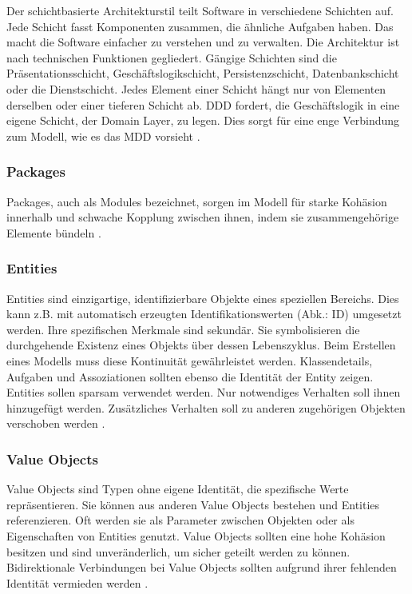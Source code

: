 {Der schichtbasierte Architekturstil teilt Software in verschiedene Schichten auf. Jede Schicht fasst Komponenten zusammen, die ähnliche Aufgaben haben. Das macht die Software einfacher zu verstehen und zu verwalten. Die Architektur ist nach technischen Funktionen gegliedert. Gängige Schichten sind die Präsentationsschicht, Geschäftslogikschicht, Persistenzschicht, Datenbankschicht oder die Dienstschicht. Jedes Element einer Schicht hängt nur von Elementen derselben oder einer tieferen Schicht ab. DDD fordert, die Geschäftslogik in eine eigene Schicht, der \glqq Domain Layer\grqq, zu legen. Dies sorgt für eine enge Verbindung zum Modell, wie es das MDD vorsieht \cite[S. 69 - 73]{evans} \cite[S.139-141]{richards}.


\subsubsection{Packages}

\glqq Packages\grqq, auch als \glqq Modules\grqq{} bezeichnet, sorgen im Modell für starke Kohäsion innerhalb und schwache Kopplung zwischen ihnen, indem sie zusammengehörige Elemente bündeln \cite[S. 109 - 116]{evans}.

\subsubsection{Entities}

\glqq Entities\grqq{} sind einzigartige, identifizierbare Objekte eines speziellen Bereichs. Dies kann z.B. mit automatisch erzeugten Identifikationswerten (Abk.: ID) umgesetzt werden. Ihre spezifischen Merkmale sind sekundär. Sie symbolisieren die durchgehende Existenz eines Objekts über dessen Lebenszyklus. Beim Erstellen eines Modells muss diese Kontinuität gewährleistet werden. Klassendetails, Aufgaben und Assoziationen sollten ebenso die Identität der Entity zeigen. Entities sollen sparsam verwendet werden. Nur notwendiges Verhalten soll ihnen hinzugefügt werden. Zusätzliches Verhalten soll zu anderen zugehörigen Objekten verschoben werden \cite[S. 89-96]{evans} \cite[S.75]{daschner}.

\subsubsection{Value Objects}

\glqq Value Objects\grqq{} sind Typen ohne eigene Identität, die spezifische Werte repräsentieren. Sie können aus anderen Value Objects bestehen und Entities referenzieren. Oft werden sie als Parameter zwischen Objekten oder als Eigenschaften von Entities genutzt. Value Objects sollten eine hohe Kohäsion besitzen und sind unveränderlich, um sicher geteilt werden zu können. Bidirektionale Verbindungen bei Value Objects sollten aufgrund ihrer fehlenden Identität vermieden werden \cite[S. 97-103]{evans} \cite[S.75]{daschner}.

}
